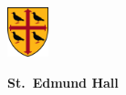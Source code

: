 
\cleartooddpage
\cleartoevenpage[\thispagestyle{empty}]
\thispagestyle{empty}
\vspace*{\fill}
\begin{center}
\includegraphics[width=12mm]{figures/seh_crest_2013.jpg}\\[2mm]
\begin{large}
{\color{teddy}\textbf{St.\ Edmund Hall}}
\end{large}
\end{center}
